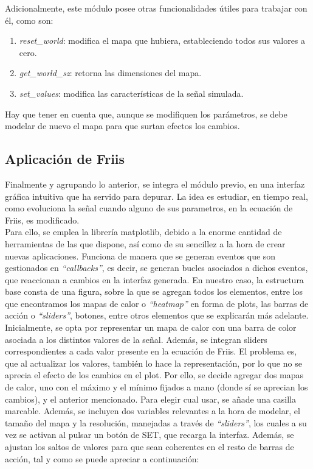 Adicionalmente, este módulo posee otras funcionalidades útiles para trabajar con él, como son:

\begin{enumerate}
    \item \emph{reset\_world}: modifica el mapa que hubiera, estableciendo todos sus valores a cero.

    \item \emph{get\_world\_sz}: retorna las dimensiones del mapa.

    \item \emph{set\_values}: modifica las características de la señal simulada.
\end{enumerate}

Hay que tener en cuenta que, aunque se modifiquen los parámetros, se debe modelar de nuevo el mapa para que surtan efectos los cambios.\\

\subsection{Aplicación de Friis}
\label{subsec:friis-app}

Finalmente y agrupando lo anterior, se integra el módulo previo, en una interfaz gráfica intuitiva que ha servido para depurar. La idea es estudiar, en tiempo real, como evoluciona la señal cuando alguno de sus parametros, en la ecuación de Friis, es modificado.\\

Para ello, se emplea la librería matplotlib, debido a la enorme cantidad de herramientas de las que dispone, así como de su sencillez a la hora de crear nuevas aplicaciones. Funciona de manera que se generan eventos que son gestionados en \emph{``callbacks''}, es decir, se generan bucles asociados a dichos eventos, que reaccionan a cambios en la interfaz generada. En nuestro caso, la estructura base consta de una figura, sobre la que se agregan todos los elementos, entre los que encontramos los mapas de calor o \emph{``heatmap''} en forma de plots, las barras de acción o \emph{``sliders''}, botones, entre otros elementos que se explicarán más adelante.\\

Inicialmente, se opta por representar un mapa de calor con una barra de color asociada a los distintos valores de la señal. Además, se integran sliders correspondientes a cada valor presente en la ecuación de Friis. El problema es, que al actualizar los valores, también lo hace la representación, por lo que no se aprecia el efecto de los cambios en el plot. Por ello, se decide agregar dos mapas de calor, uno con el máximo y el mínimo fijados a mano (donde sí se aprecian los cambios), y el anterior mencionado. Para elegir cual usar, se añade una casilla marcable. Además, se incluyen dos variables relevantes a la hora de modelar, el tamaño del mapa y la resolución, manejadas a través de \emph{``sliders''}, los cuales a su vez se activan al pulsar un botón de SET, que recarga la interfaz. Además, se ajustan los saltos de valores para que sean coherentes en el resto de barras de acción, tal y como se puede apreciar a continuación:\\

